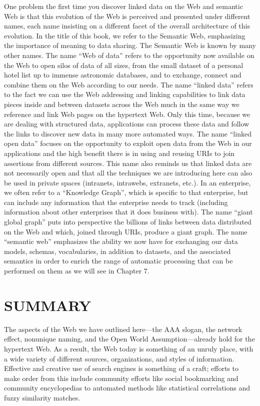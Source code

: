 One problem the first time you discover linked data on the Web and
semantic Web is that this evolution of the Web is perceived and
presented under different names, each name insisting on a different
facet of the overall architecture of this evolution. In the title of
this book, we refer to the Semantic Web, emphasizing the importance of
meaning to data sharing. The Semantic Web is known by many other names.
The name ``Web of data'' refers to the opportunity now available on the
Web to open silos of data of all sizes, from the small dataset of a
personal hotel list up to immense astronomic databases, and to exchange,
connect and combine them on the Web according to our needs. The name
``linked data'' refers to the fact we can use the Web addressing and
linking capabilities to link data pieces inside and between datasets
across the Web much in the same way we reference and link Web pages on
the hypertext Web. Only this time, because we are dealing with structured
data, applications can process these data and follow the links to
discover new data in many more automated ways. The name ``linked open
data'' focuses on the opportunity to exploit open data from the Web in
our applications and the high benefit there is in using and reusing URIs
to join assertions from different sources. This name also reminds us
that linked data are not necessarily open and that all the techniques we
are introducing here can also be used in private spaces (intranets,
intrawebs, extranets, etc.). In an enterprise, we often refer to a
``Knowledge Graph'', which is specific to that enterprise, but can
include any information that the enterprise needs to track (including
information about other enterprises that it does business with). The
name ``giant global graph'' puts into perspective the billions of links
between data distributed on the Web and which, joined through URIs,
produce a giant graph. The name ``semantic web'' emphasizes the ability
we now have for exchanging our data models, schemas, vocabularies, in
addition to datasets, and the associated semantics in order to enrich
the range of automatic processing that can be performed on them as we
will see in Chapter 7.

\section{SUMMARY}

The aspects of the Web we have outlined here---the AAA slogan, the
network effect, nonunique naming, and the Open World
Assumption---already hold for the hypertext Web. As a result, the Web
today is something of an unruly place, with a wide variety of different
sources, organizations, and styles of information. Effective and
creative use of search engines is something of a craft; efforts to make
order from this include community efforts like social bookmarking and
community encyclopedias to automated methods like statistical
correlations and fuzzy similarity matches.

